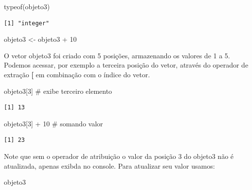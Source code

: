 \documentclass[
  letterpaper,
  DIV=11,
  numbers=noendperiod]{scrreprt}
\newenvironment{Shaded}{\begin{snugshade}}{\end{snugshade}}
\newcommand{\CommentTok}[1]{\textcolor[rgb]{0.37,0.37,0.37}{#1}}
\newcommand{\DecValTok}[1]{\textcolor[rgb]{0.68,0.00,0.00}{#1}}
\newcommand{\FunctionTok}[1]{\textcolor[rgb]{0.28,0.35,0.67}{#1}}
\newcommand{\NormalTok}[1]{\textcolor[rgb]{0.00,0.23,0.31}{#1}}
\newcommand{\OtherTok}[1]{\textcolor[rgb]{0.00,0.23,0.31}{#1}}
\newcommand{\SpecialCharTok}[1]{\textcolor[rgb]{0.37,0.37,0.37}{#1}}
\begin{document}
\begin{Shaded}
\begin{Highlighting}[]
\FunctionTok{typeof}\NormalTok{(objeto3)}
\end{Highlighting}
\end{Shaded}

\begin{verbatim}
[1] "integer"
\end{verbatim}

\begin{Shaded}
\begin{Highlighting}[]
\NormalTok{objeto3 }\OtherTok{\textless{}{-}}\NormalTok{ objeto3 }\SpecialCharTok{+} \DecValTok{10}
\end{Highlighting}
\end{Shaded}

O vetor objeto3 foi criado com 5 posições, armazenando os valores de 1 a
5. Podemos acessar, por exemplo a terceira posição do vetor, através do
operador de extração \textbf{{[}} em combinação com o índice do vetor.

\begin{Shaded}
\begin{Highlighting}[]
\NormalTok{objeto3[}\DecValTok{3}\NormalTok{] }\CommentTok{\# exibe terceiro elemento}
\end{Highlighting}
\end{Shaded}

\begin{verbatim}
[1] 13
\end{verbatim}

\begin{Shaded}
\begin{Highlighting}[]
\NormalTok{objeto3[}\DecValTok{3}\NormalTok{] }\SpecialCharTok{+} \DecValTok{10} \CommentTok{\# somando valor}
\end{Highlighting}
\end{Shaded}

\begin{verbatim}
[1] 23
\end{verbatim}

Note que sem o operador de atribuição o valor da posição 3 do objeto3
não é atualizada, apenas exibda no console. Para atualizar seu valor
usamos:

\begin{Shaded}
\begin{Highlighting}[]
\NormalTok{objeto3}
\end{Highlighting}
\end{Shaded}
\end{document}
